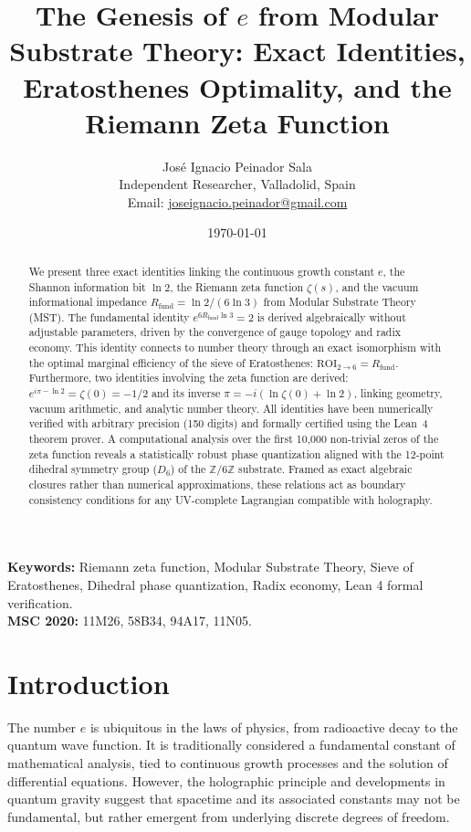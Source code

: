 \documentclass[10pt,a4paper]{article}
\title{The Genesis of \texorpdfstring{\(e\)}{e} from Modular Substrate Theory: Exact Identities, Eratosthenes Optimality, and the Riemann Zeta Function}
\author{José Ignacio Peinador Sala \orcidlink{0009-0008-1822-3452} \\ 
\small Independent Researcher, Valladolid, Spain \\
\small Email: \href{mailto:joseignacio.peinador@gmail.com}{joseignacio.peinador@gmail.com}}
\date{\today}
\newcommand{\Rfund}{R_{\text{fund}}}
\begin{document}
\maketitle

\begin{abstract}
We present three exact identities linking the continuous growth constant \(e\), the Shannon information bit \(\ln 2\), the Riemann zeta function \(\zeta(s)\), and the vacuum informational impedance \(\Rfund = \ln 2/(6\ln 3)\) from Modular Substrate Theory (MST).
The fundamental identity \(e^{6\Rfund\ln 3} = 2\) is derived algebraically without adjustable parameters, driven by the convergence of gauge topology and radix economy.
This identity connects to number theory through an exact isomorphism with the optimal marginal efficiency of the sieve of Eratosthenes: \(\mathrm{ROI}_{2\to 6} = \Rfund\).
Furthermore, two identities involving the zeta function are derived: \(e^{i\pi - \ln 2} = \zeta(0) = -1/2\) and its inverse \(\pi = -i(\ln\zeta(0) + \ln 2)\), linking geometry, vacuum arithmetic, and analytic number theory.
All identities have been numerically verified with arbitrary precision (150 digits) and formally certified using the Lean~4 theorem prover.
A computational analysis over the first 10,000 non-trivial zeros of the zeta function reveals a statistically robust phase quantization aligned with the 12-point dihedral symmetry group (\(D_6\)) of the \(\mathbb{Z}/6\mathbb{Z}\) substrate.
Framed as exact algebraic closures rather than numerical approximations, these relations act as boundary consistency conditions for any UV-complete Lagrangian compatible with holography.\\
\end{abstract}
\vspace{1em}
\noindent\textbf{Keywords:} Riemann zeta function, Modular Substrate Theory, Sieve of Eratosthenes, Dihedral phase quantization, Radix economy, Lean 4 formal verification. \\
\noindent\textbf{MSC 2020:} 11M26, 58B34, 94A17, 11N05.

\section{Introduction}

The number \(e\) is ubiquitous in the laws of physics, from radioactive decay to the quantum wave function.
It is traditionally considered a fundamental constant of mathematical analysis, tied to continuous growth processes and the solution of differential equations.
However, the holographic principle \cite{tHooft1993, Susskind1995} and developments in quantum gravity suggest that spacetime and its associated constants may not be fundamental, but rather emergent from underlying discrete degrees of freedom.
\end{document}
